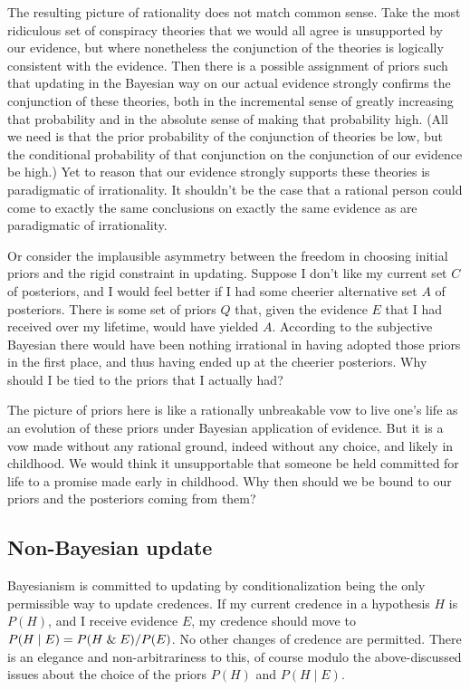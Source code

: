 The resulting picture of rationality does not match common sense. Take the most
ridiculous set of conspiracy theories that we would all agree is unsupported by our evidence, 
but where nonetheless the conjunction of the theories is logically consistent with the evidence.
Then there is a possible assignment of priors such that updating in the Bayesian way on our actual 
evidence strongly confirms the conjunction of these theories, both in the incremental sense of 
greatly increasing that probability and in the absolute sense of making that probability high. (All 
we need is that the prior probability of the conjunction of theories be low, but the conditional
probability of that conjunction on the conjunction of our evidence be high.) Yet to reason that
our evidence strongly supports these theories is paradigmatic of irrationality. It shouldn't be the
case that a rational person could come to exactly the same conclusions on exactly the same evidence
as are paradigmatic of irrationality.

Or consider the implausible asymmetry between the freedom in choosing initial priors and the
rigid constraint in updating. Suppose I don't like my current set $C$ of posteriors, and I would 
feel better if  I had some cheerier alternative set $A$ of posteriors. There is some set of priors $Q$ that, 
given the evidence $E$ that I had received over my lifetime, would have yielded $A$. According to 
the subjective Bayesian there would have been nothing irrational in having adopted those priors in 
the first place, and thus having ended up at the cheerier posteriors. Why should I be tied to the
priors that I actually had? 

The picture of priors here is like a rationally unbreakable vow to live one's life as an evolution
of these priors under Bayesian application of evidence. But it is a vow made without any rational 
ground, indeed without any choice, and likely in childhood. We would think it unsupportable that
someone be held committed for life to a promise made early in childhood. Why then should we be bound to
our priors and the posteriors coming from them?


\subsection{Non-Bayesian update}
Bayesianism is committed to updating by conditionalization being the only permissible way to update credences. 
If my current credence in a hypothesis $H$ is $P(H)$, and I receive evidence $E$, my credence should move 
to $P(H\mid E)=P(H\mathrel{\&} E)/P(E)$. No other changes of credence are permitted. There is an elegance and non-arbitrariness to this,
of course modulo the above-discussed issues about the choice of the priors $P(H)$ and $P(H\mid E)$.

